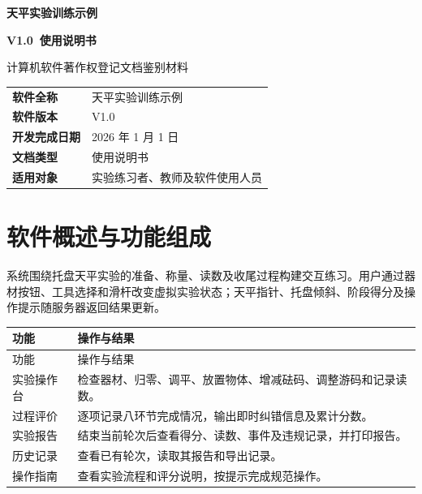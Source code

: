 \documentclass[UTF8,fontset=windows,zihao=-4]{ctexart}
\newcommand{\softwareName}{天平实验训练示例}
\newcommand{\softwareVersion}{V1.0}
\begin{document}
\begin{titlepage}
  \centering
  \vspace*{28mm}
  {\bfseries \softwareName\par}
  \vspace{8mm}
  {\bfseries \softwareVersion\ 使用说明书\par}
  \vspace{18mm}
  { 计算机软件著作权登记文档鉴别材料\par}
  \vfill
  \begin{tabular}{>{\bfseries}p{36mm}p{86mm}}
    软件全称 & 天平实验训练示例 \\
    软件版本 & V1.0 \\
    开发完成日期 & 2026 年 1 月 1 日 \\
    文档类型 & 使用说明书 \\
    适用对象 & 实验练习者、教师及软件使用人员 \\
  \end{tabular}
  \vfill
\end{titlepage}

\begingroup
\small
{}
\setlength{\parskip}{0pt}
\tableofcontents
\endgroup
\clearpage

\section{软件概述与功能组成}

系统围绕托盘天平实验的准备、称量、读数及收尾过程构建交互练习。用户通过器材按钮、工具选择和滑杆改变虚拟实验状态；天平指针、托盘倾斜、阶段得分及操作提示随服务器返回结果更新。

\begin{longtable}{@{}p{38mm}p{114mm}@{}}

\toprule

功能 & 操作与结果 \\

\midrule

\endfirsthead

\toprule

功能 & 操作与结果 \\

\midrule

\endhead

实验操作台 & 检查器材、归零、调平、放置物体、增减砝码、调整游码和记录读数。 \\

过程评价 & 逐项记录八环节完成情况，输出即时纠错信息及累计分数。 \\

实验报告 & 结束当前轮次后查看得分、读数、事件及违规记录，并打印报告。 \\

历史记录 & 查看已有轮次，读取其报告和导出记录。 \\

操作指南 & 查看实验流程和评分说明，按提示完成规范操作。 \\

\bottomrule

\end{longtable}
\end{document}
